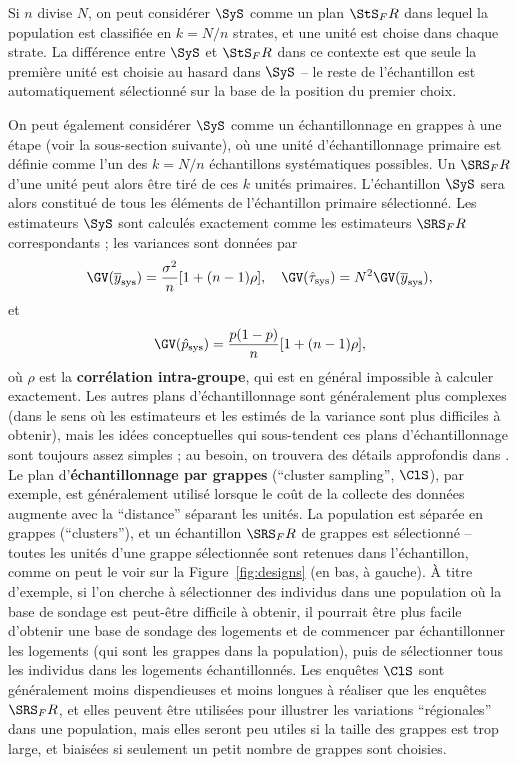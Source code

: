 Si $n$ divise $N$, on peut consid\'erer $\SyS$  comme un plan $\StS_FR$ dans lequel la population est classifi\'ee en $k=N/n$ strates, et une unit\'e est choise dans chaque strate. La différence entre $\SyS$ et $\StS_FR$ dans ce contexte est que seule la première unité est choisie au hasard dans $\SyS$ -- le reste de l'\'echantillon est automatiquement sélectionné sur la base de la position du premier choix. \par On peut également considérer $\SyS$ comme un échantillonnage en grappes à une étape (voir la sous-section suivante), où une unité d'échantillonnage primaire est définie comme l'un des $k=N/n$ échantillons systématiques possibles. Un $\SRS_FR$ d'une unité peut alors être tiré de ces $k$ unités primaires. L'échantillon $\SyS$ sera alors constitué de tous les éléments de l'échantillon primaire sélectionné.
\newl Les estimateurs $\SyS$ sont calculés exactement comme les estimateurs $\SRS_FR$ correspondants ; les variances sont données par  
$$\GV(\overline{y}_{\textrm{sys}})=\frac{\sigma^2}{n}[1+(n-1)\rho],\quad  \GV(\hat{\tau}_{\textrm{sys}})=N^2\GV(\overline{y}_{\textrm{sys}}),$$ et $$\GV(\hat{p}_{\textrm{sys}})=\frac{p(1-p)}{n}[1+(n-1)\rho],$$ où $\rho$ est la \textbf{corrélation intra-groupe}, qui est en général impossible à calculer exactement. \newl Les autres plans d'échantillonnage sont généralement plus complexes (dans le sens o\`u les estimateurs et les estim\'es de la variance sont plus difficiles à obtenir), mais les idées conceptuelles qui sous-tendent ces plans d'échantillonnage sont toujours assez simples ; au besoin, on trouvera des détails approfondis  dans \cite{DC_SC}.
\newpage\noindent Le plan d'\textbf{\'echantillonnage par grappes} (``cluster sampling'', $\ClS$), par exemple, est généralement utilisé lorsque le coût de la collecte des données augmente avec la ``distance'' séparant les unit\'es. La population est séparée en grappes (``clusters''), et un \'echantillon $\SRS_FR$ de grappes est sélectionné -- toutes les unités d'une grappe sélectionnée sont retenues dans l'échantillon, comme on peut le voir sur la  Figure~\ref{fig:designs} (en bas, à gauche). À titre d'exemple, si l'on cherche \`a s\'electionner des individus dans une population o\`u la base de sondage est peut-être difficile à obtenir, il pourrait être plus facile d'obtenir une base de sondage des logements et de commencer par échantillonner les logements (qui sont les grappes dans la population), puis de sélectionner tous les individus dans les logements échantillonnés. Les enquêtes $\ClS$ sont généralement moins dispendieuses et moins longues à réaliser que les enquêtes $\SRS_FR$, et elles peuvent être utilisées pour illustrer les variations ``régionales'' dans une population, mais elles seront peu utiles si la taille des grappes est trop large, et biaisées si seulement un petit nombre de grappes sont choisies.